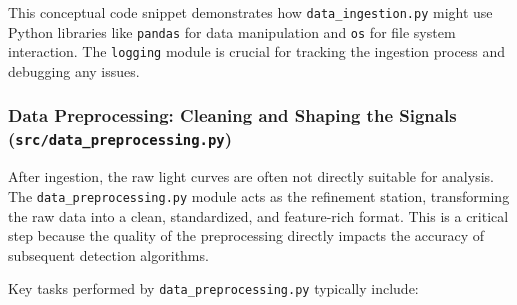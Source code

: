 \documentclass{article}
\begin{document}
This conceptual code snippet demonstrates how \texttt{data\_ingestion.py} might use Python libraries like \texttt{pandas} for data manipulation and \texttt{os} for file system interaction. The \texttt{logging} module is crucial for tracking the ingestion process and debugging any issues.

\subsubsection{Data Preprocessing: Cleaning and Shaping the Signals (\texttt{src/data\_preprocessing.py})}

After ingestion, the raw light curves are often not directly suitable for analysis. The \texttt{data\_preprocessing.py} module acts as the refinement station, transforming the raw data into a clean, standardized, and feature-rich format. This is a critical step because the quality of the preprocessing directly impacts the accuracy of subsequent detection algorithms.

Key tasks performed by \texttt{data\_preprocessing.py} typically include:
\end{document}
